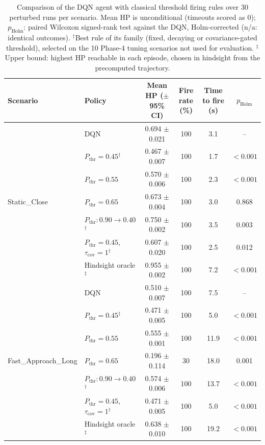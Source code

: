 \begin{table}[htbp]
\centering
\caption{Comparison of the DQN agent with classical threshold firing rules over 30 perturbed runs per scenario. Mean HP is unconditional (timeouts scored as 0); $p_{\mathrm{Holm}}$: paired Wilcoxon signed-rank test against the DQN, Holm-corrected (n/a: identical outcomes). $^{\dagger}$Best rule of its family (fixed, decaying or covariance-gated threshold), selected on the 10 Phase-4 tuning scenarios not used for evaluation. $^{\ddagger}$Upper bound: highest HP reachable in each episode, chosen in hindsight from the precomputed trajectory.}
\label{tab:comparison-traditional-rl}
\small
\begin{tabular}{llcccc}
\toprule
\textbf{Scenario} & \textbf{Policy} & \textbf{Mean HP ($\pm$95\% CI)} & \textbf{Fire rate (\%)} & \textbf{Time to fire (s)} & $p_{\mathrm{Holm}}$ \\
\midrule
\multirow{7}{*}{Static\_Close} & DQN & 0.694 $\pm$ 0.021 & 100 & 3.1 & -- \\
 & $P_{\mathrm{thr}}=0.45$$^{\dagger}$ & 0.467 $\pm$ 0.007 & 100 & 1.7 & $<0.001$ \\
 & $P_{\mathrm{thr}}=0.55$ & 0.570 $\pm$ 0.006 & 100 & 2.3 & $<0.001$ \\
 & $P_{\mathrm{thr}}=0.65$ & 0.673 $\pm$ 0.004 & 100 & 3.0 & 0.868 \\
 & $P_{\mathrm{thr}}: 0.90 \to 0.40$$^{\dagger}$ & 0.750 $\pm$ 0.002 & 100 & 3.5 & 0.003 \\
 & $P_{\mathrm{thr}}=0.45$, $\tau_{\mathrm{cov}}=1$$^{\dagger}$ & 0.607 $\pm$ 0.020 & 100 & 2.5 & 0.012 \\
 & Hindsight oracle$^{\ddagger}$ & 0.955 $\pm$ 0.002 & 100 & 7.2 & $<0.001$ \\
\midrule
\multirow{7}{*}{Fast\_Approach\_Long} & DQN & 0.510 $\pm$ 0.007 & 100 & 7.5 & -- \\
 & $P_{\mathrm{thr}}=0.45$$^{\dagger}$ & 0.471 $\pm$ 0.005 & 100 & 5.0 & $<0.001$ \\
 & $P_{\mathrm{thr}}=0.55$ & 0.555 $\pm$ 0.001 & 100 & 11.9 & $<0.001$ \\
 & $P_{\mathrm{thr}}=0.65$ & 0.196 $\pm$ 0.114 & 30 & 18.0 & 0.001 \\
 & $P_{\mathrm{thr}}: 0.90 \to 0.40$$^{\dagger}$ & 0.574 $\pm$ 0.006 & 100 & 13.7 & $<0.001$ \\
 & $P_{\mathrm{thr}}=0.45$, $\tau_{\mathrm{cov}}=1$$^{\dagger}$ & 0.471 $\pm$ 0.005 & 100 & 5.0 & $<0.001$ \\
 & Hindsight oracle$^{\ddagger}$ & 0.638 $\pm$ 0.010 & 100 & 19.2 & $<0.001$ \\

\end{tabular}
\end{table}
